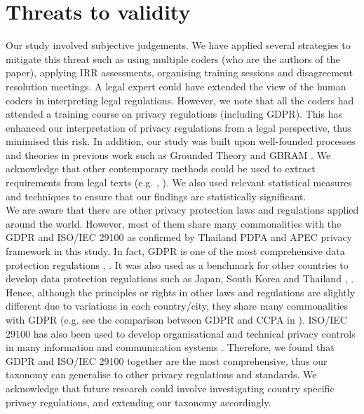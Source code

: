 \section{Threats to validity} \label{sec:threats}


Our study involved subjective judgements. We have applied several strategies to mitigate this threat such as using multiple coders (who are the authors of the paper), applying IRR assessments, organising training sessions and disagreement resolution meetings. A legal expert could have extended the view of the human coders in interpreting legal regulations. However, we note that all the coders had attended a training course on privacy regulations (including GDPR). This has enhanced our interpretation of privacy regulations from a legal perspective, thus minimised this risk. In addition, our study was built upon well-founded processes and theories in previous work such as Grounded Theory \cite{Glaser2017} and GBRAM \cite{Antn2004}. We acknowledge that other contemporary methods could be used to extract requirements from legal texts (e.g. \cite{Breaux2006}, \cite{Ghanavati2009}). We also used relevant statistical measures and techniques to ensure that our findings are statistically significant. \\
\indent We are aware that there are other privacy protection laws and regulations applied around the world. However, most of them share many commonalities with the GDPR and ISO/IEC 29100 as confirmed by Thailand PDPA and APEC privacy framework in this study. 
In fact, GDPR is one of the most comprehensive data protection regulations \cite{Linden2020}, \cite{Tsohou2020}. It was also used as a benchmark for other countries to develop data protection regulations such as Japan, South Korea and Thailand \cite{Torre}, \cite{Laboris2019}. Hence, although the principles or rights in other laws and regulations are slightly different due to variations in each country/city, they share many commonalities with GDPR (e.g. see the comparison between GDPR and CCPA in \cite{DataPrivacyManager}). ISO/IEC 29100 has also been used to develop organisational and technical privacy controls in many information and communication systems \cite{PECB2015}. Therefore, we found that GDPR and ISO/IEC 29100 together are the most comprehensive, thus our taxonomy can generalise to other privacy regulations and standards. We acknowledge that future research could involve investigating country specific privacy regulations, and extending our taxonomy accordingly.  \\

